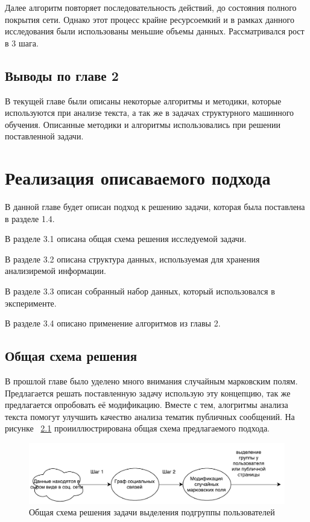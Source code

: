 \documentclass[annotation,times,page4]{itmo-student-thesis}
\begin{document}
Далее алгоритм повторяет последовательность действий, до состояния полного покрытия сети. Однако этот процесс крайне ресурсоемкий и в рамках данного исследования были использованы меньшие объемы данных. Рассматривался рост в 3 шага.
 
\section{Выводы по главе 2}
В текущей главе были описаны некоторые алгоритмы и методики, которые используются при анализе текста, а так же в задачах структурного машинного обучения. Описанные методики и алгоритмы использовались при решении поставленной задачи.
 
\chapter{Реализация описаваемого подхода}
В данной главе будет описан подход к решению задачи, которая была поставлена в разделе 1.4.

В разделе 3.1 описана общая схема решения исследуемой задачи. 

В разделе 3.2 описана структура данных, используемая для хранения анализиремой информации. 

В разделе 3.3 описан собранный набор данных, который использовался в эксперименте.

В разделе 3.4 описано применение алгоритмов из главы 2.

\section{Общая схема решения}
В прошлой главе было уделено много внимания случайным марковским полям. Предлагается решать поставленную задачу использую эту концепцию, так же предлагается опробовать её модификацию. Вместе с тем, алогритмы анализа текста помогут улучшить качество анализа тематик публичных сообщений. На рисунке ~\ref{fig:plan} проииллюстрирована общая схема предлагаемого подхода.

\begin{figure}[!h]
\caption{Общая схема решения задачи выделения подгруппы пользователей}
\label{fig:plan}
\centering
\includegraphics[width=\textwidth]{figs/plan.pdf}
\end{figure}
\end{document}
